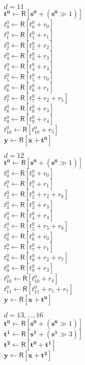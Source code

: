 \documentclass{article}
\newcommand{\reg}[1]{\mathsf{R}\left[#1\right]}
\newcommand{\vect}[1]{\mathbf{#1}}
\begin{document}
\begin{multicols}{3}
{        {\centering $d=11$\\}
        \noindent
        $\vect{t^0} \leftarrow \reg{\vect{s^0} + (\vect{s^0} \gg 1)}$ \\
        $t^0_0 \leftarrow \reg{t^0_0 + r_0}$ \\
        $t^0_1 \leftarrow \reg{t^0_1 + r_1}$ \\
        $t^0_2 \leftarrow \reg{t^0_2 + r_2}$ \\
        $t^0_3 \leftarrow \reg{t^0_3 + r_3}$ \\
        $t^0_4 \leftarrow \reg{t^0_4 + r_4}$ \\
        $t^0_5 \leftarrow \reg{t^0_5 + r_0}$ \\
        $t^0_6 \leftarrow \reg{t^0_6 + r_1}$ \\
        $t^0_7 \leftarrow \reg{t^0_7 + r_2 + r_5}$ \\
        $t^0_8 \leftarrow \reg{t^0_8 + r_3}$ \\
        $t^0_9 \leftarrow \reg{t^0_9 + r_4}$ \\
        $t^0_{10} \leftarrow \reg{t^0_{10} + r_5}$ \\
        $\vect{y} \leftarrow \reg{\vect{x} + \vect{t^0}}$

        {\centering $d=12$\\}
        \noindent
        $\vect{t^0} \leftarrow \reg{\vect{s^0} + (\vect{s^0} \gg 1)}$ \\
        $t^0_0 \leftarrow \reg{t^0_0 + r_0}$ \\
        $t^0_1 \leftarrow \reg{t^0_1 + r_1}$ \\
        $t^0_2 \leftarrow \reg{t^0_2 + r_2 + r_6}$ \\
        $t^0_3 \leftarrow \reg{t^0_3 + r_3}$ \\
        $t^0_4 \leftarrow \reg{t^0_4 + r_4}$ \\
        $t^0_5 \leftarrow \reg{t^0_5 + r_5 + r_6}$ \\
        $t^0_6 \leftarrow \reg{t^0_6 + r_0}$ \\
        $t^0_7 \leftarrow \reg{t^0_7 + r_1}$ \\
        $t^0_8 \leftarrow \reg{t^0_8 + r_2 + r_7}$ \\
        $t^0_9 \leftarrow \reg{t^0_9 + r_3}$ \\
        $t^0_{10} \leftarrow \reg{t^0_{10} + r_4}$ \\
        $t^0_{11} \leftarrow \reg{t^0_{11} + r_5 + r_7}$ \\
        $\vect{y} \leftarrow \reg{\vect{x} + \vect{t^0}}$

        {\centering $d=13,\dots,16$\\}
        \noindent
        $\vect{t^0} \leftarrow \reg{\vect{s^0} + (\vect{s^0} \gg 1)}$ \\
        $\vect{t^1} \leftarrow \reg{\vect{s^1} + (\vect{s^1} \gg 3)}$ \\
        $\vect{t^2} \leftarrow \reg{\vect{t^0} + \vect{t^1}}$ \\
        $\vect{y} \leftarrow \reg{\vect{x} + \vect{t^2}}$
    }
\end{multicols}
\end{document}
